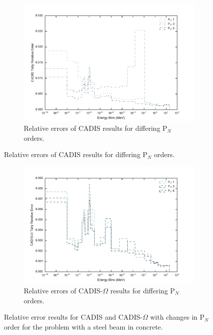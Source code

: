 \begin{figure}[htb!]
  \centering
  \begin{subfigure}[t]{\textwidth}
    \centering
    \includegraphics[width=\linewidth]{./chapters/characterization_probs/figures/angle/prob_1/err_pN_cadis.pdf}
    \caption{Relative errors of CADIS results for differing P$_N$ orders.}
    \label{fig:pn_cad_err}
  \end{subfigure}
\end{figure}
\begin{figure}[htb!]\ContinuedFloat
  \centering
  \begin{subfigure}[t]{\textwidth}
    \centering
    \includegraphics[width=\linewidth]{./chapters/characterization_probs/figures/angle/prob_1/err_pN_cadisangle.pdf}
    \caption{Relative errors of CADIS-$\Omega$ results for differing P$_N$
    orders.}
    \label{fig:pn_cadangle_err}
  \end{subfigure}
  \caption[Relative error results for CADIS and CADIS-$\Omega$ with changes in
  P$_N$ order for the problem with a steel beam in concrete.]
  {Relative error results for CADIS and CADIS-$\Omega$ with changes in
  P$_N$ order for the problem with a steel beam in concrete.}
  \label{fig:quad_errs}
\end{figure}

